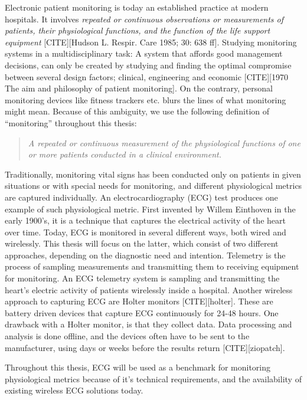 Electronic patient monitoring is today an established practice at modern hospitals. It involves \textit{repeated or continuous observations or measurements of patients, their physiological functions, and the function of the life support equipment} [CITE][Hudson L. Respir. Care 1985; 30: 638 ff]. Studying monitoring systems in a multidisciplinary task: A system that affords good management decisions, can only be created by studying and finding the optimal compromise between several design factors; clinical, engineering and economic [CITE][1970 The aim and philosophy of patient monitoring]. On the contrary, personal monitoring devices like fitness trackers etc. blurs the lines of what monitoring might mean. Because of this ambiguity, we use the following definition of ``monitoring'' throughout this thesis:

\begin{quote} 
\textit{A repeated or continuous measurement of the physiological functions of one or more patients conducted in a clinical environment.}
\end{quote}

Traditionally, monitoring vital signs has been conducted only on patients in given situations or with special needs for monitoring, and different physiological metrics are captured individually. An electrocardiography (ECG) test produces one example of such physiological metric. First invented by Willem Einthoven in the early 1900's, it is a technique that captures the electrical activity of the heart over time. Today, ECG is monitored in several different ways, both wired and wirelessly. This thesis will focus on the latter, which consist of two different approaches, depending on the diagnostic need and intention. Telemetry is the process of sampling measurements and transmitting them to receiving equipment for monitoring. An ECG telemetry system is sampling and transmitting the heart's electric activity of patients wirelessly inside a hospital. Another wireless approach to capturing ECG are Holter monitors [CITE][holter]. These are battery driven devices that capture ECG continuously for 24-48 hours. One drawback with a Holter monitor, is that they collect data. Data processing and analysis is done offline, and the devices often have to be sent to the manufacturer, using days or weeks before the results return [CITE][ziopatch].

Throughout this thesis, ECG will be used as a benchmark for monitoring physiological metrics because of it's technical requirements, and the availability of existing wireless ECG solutions today.

